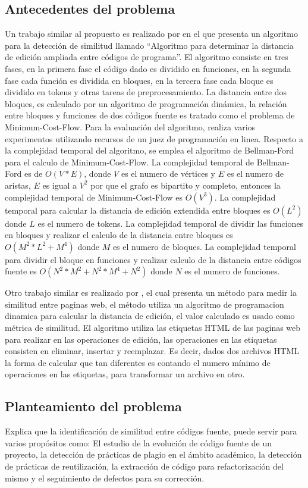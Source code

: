\subsection{Antecedentes del problema}
Un trabajo similar al propuesto es realizado por \cite{Anzai2019} en el que presenta un algoritmo para la detección de similitud llamado ``Algoritmo para determinar la distancia de edición ampliada entre códigos de programa''. El algoritmo consiste en tres fases, en la primera fase el código dado es dividido en funciones, en la segunda fase cada función es dividida en bloques, en la tercera fase cada bloque es dividido en tokens y otras tareas de preprocesamiento. La distancia entre dos bloques, es calculado por un algoritmo de programación dinámica, la relación entre bloques y funciones de dos códigos fuente es tratado como el problema de Minimum-Cost-Flow. Para la evaluación del algoritmo, realiza varios experimentos utilizando recursos de un juez de programación en linea. Respecto a la complejidad temporal del algoritmo, se emplea el algoritmo de Bellman-Ford para el calculo de Minimum-Cost-Flow. La complejidad temporal de Bellman-Ford es de $O(V*E)$, donde $V$ es el numero de vértices y $E$ es el numero de aristas, $E$ es igual a $V^{2}$ por que el grafo es bipartito y completo, entonces la complejidad temporal de Minimum-Cost-Flow es $O(V^{3})$. La complejidad temporal para calcular la distancia de edición extendida entre bloques es $O(L^{2})$ donde $L$ es el numero de tokens. La complejidad temporal de dividir las funciones en bloques y realizar el calculo de la distancia entre bloques es $O(M^{2}*L^{2}+M^{4})$ donde $M$ es el numero de bloques. La complejidad temporal para dividir el bloque en funciones y realizar calculo de la distancia entre códigos fuente es $O(N^{2}*M^{2}+N^{2}*M^{4}+N^{2})$ donde $N$ es el numero de funciones.

Otro trabajo similar es realizado por \cite{Popescu2016}, el cual presenta un método para medir la similitud entre paginas web, el método utiliza un algoritmo de programacion dinamica para calcular la distancia de edición, el valor calculado es usado como métrica de similitud. El algoritmo utiliza las etiquetas HTML de las paginas web para realizar en las operaciones de edición, las operaciones en las etiquetas consisten en eliminar, insertar y reemplazar. Es decir, dados dos archivos HTML la forma de calcular que tan diferentes es contando el numero mínimo de operaciones en las etiquetas, para transformar un archivo en otro.

\subsection{Planteamiento del problema}
\cite{Cheers2021} Explica que la identificación de similitud entre códigos fuente, puede servir para varios propósitos como: El estudio de la evolución de código fuente de un proyecto, la detección de prácticas de plagio en el ámbito académico, la detección de prácticas de reutilización, la extracción de código para refactorización del mismo y el seguimiento de defectos para su corrección.

